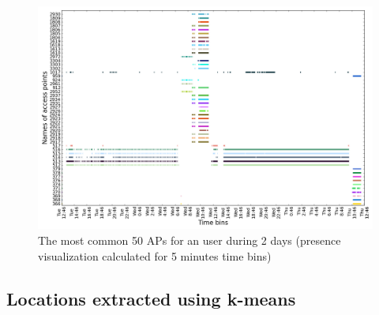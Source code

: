 \begin{figure}[!h]
\centering
\includegraphics[width=1\textwidth]{figures/presence/user_3_sorted_2days_no_rssi_plot.png}
\caption{The most common 50 APs for an user during 2 days (presence
visualization calculated for 5 minutes time bins)}
\label{user_3_pres_2d_A}
\end{figure}

\subsection{Locations extracted using k-means}
\label{appendix_kmeans}
